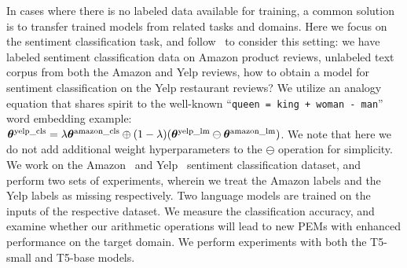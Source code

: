 In cases where there is no labeled data available for training, a common solution is to transfer trained models from related tasks and domains. 
Here we focus on the sentiment classification task, and follow~\citet{ilharco2022editing} to consider this setting: we have labeled sentiment classification data on Amazon product reviews, unlabeled text corpus from both the Amazon and Yelp reviews, how to obtain a model for sentiment classification on the Yelp restaurant reviews? 
We utilize an analogy equation that shares spirit to the well-known ``\texttt{queen = king + woman - man}'' word embedding example: ${\bm{\theta}}^{\text{yelp\_cls}} = \lambda{\bm{\theta}}^{\text{amazon\_cls}}\oplus(1-\lambda)({\bm{\theta}}^{\text{yelp\_lm}}\ominus{\bm{\theta}}^{\text{amazon\_lm}})$.
We note that here we do not add additional weight hyperparameters to the $\ominus$ operation for simplicity. 
We work on the Amazon~\citep{mcauley2013hidden} and Yelp~\citep{zhang2015character} sentiment classification dataset, and perform two sets of experiments, wherein we treat the Amazon labels and the Yelp labels as missing respectively. 
Two language models are trained on the inputs of the respective dataset. 
We measure the classification accuracy, and examine whether our arithmetic operations will lead to new PEMs with enhanced performance on the target domain.
We perform experiments with both the T5-small and T5-base models.



